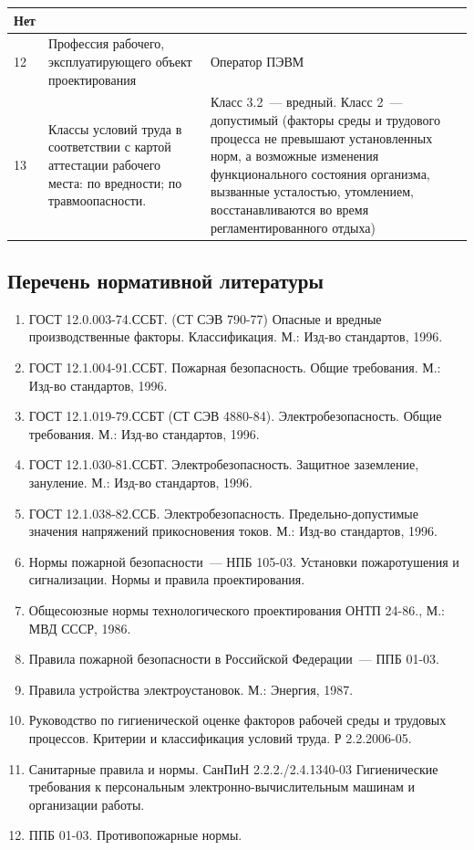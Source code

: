\begin{longtable}[h]{|p{}|p{}|p{}|}
    Нет
  \\ \hline
    12 &
    Профессия рабочего, эксплуатирующего объект проектирования &
    Оператор ПЭВМ
  \\ \hline
    13 &
    Классы условий труда в соответствии с картой аттестации рабочего места:\newline
    по вредности;\newline
    по травмоопасности. &
    Класс 3.2~--- вредный.\newline
    Класс 2~--- допустимый (факторы среды и трудового процесса не превышают установленных норм, а возможные изменения функционального состояния организма, вызванные усталостью, утомлением, восстанавливаются во время регламентированного отдыха)
  \\ \hline
\end{longtable}
\normalsize
\onehalfspacing
\vspace{1cm}


\subsection{Перечень нормативной литературы}

\begin{enumerate}[label=\arabic*)]
  \item{ГОСТ 12.0.003-74.ССБТ. (СТ СЭВ 790-77) Опасные и вредные производственные факторы. Классификация. М.: Изд-во стандартов, 1996.}
  \item{ГОСТ 12.1.004-91.ССБТ. Пожарная безопасность. Общие требования. М.: Изд-во стандартов, 1996.}
  \item{ГОСТ 12.1.019-79.ССБТ (СТ СЭВ 4880-84). Электробезопасность. Общие требования. М.: Изд-во стандартов, 1996.}
  \item{ГОСТ 12.1.030-81.ССБТ. Электробезопасность. Защитное заземление, зануление. М.: Изд-во стандартов, 1996.}
  \item{ГОСТ 12.1.038-82.ССБ. Электробезопасность. Предельно-допустимые значения напряжений прикосновения токов. М.: Изд-во стандартов, 1996.}
  \item{Нормы пожарной безопасности~--- НПБ 105-03. Установки пожаротушения и сигнализации. Нормы и правила проектирования.}
  \item{Общесоюзные нормы технологического проектирования ОНТП 24-86., М.: МВД СССР, 1986.}
  \item{Правила пожарной безопасности в Российской Федерации~--- ППБ 01-03.}
  \item{Правила устройства электроустановок. М.: Энергия, 1987.}
  \item{Руководство по гигиенической оценке факторов рабочей среды и трудовых процессов. Критерии и классификация условий труда. Р 2.2.2006-05.}
  \item{Санитарные правила и нормы. СанПиН 2.2.2./2.4.1340-03 Гигиенические требования к персональным электронно-вычислительным машинам и организации работы.}
  \item{ППБ 01-03. Противопожарные нормы.}
\end{enumerate}


